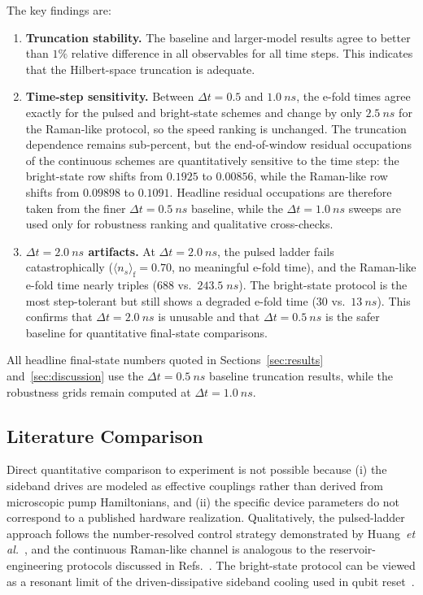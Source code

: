 \documentclass[aps,pra,twocolumn,reprint,floatfix,amsmath,amssymb]{revtex4-2}
\begin{document}
The key findings are:
\begin{enumerate}
\item \textbf{Truncation stability.}  The baseline and larger-model results agree to better than $1\%$ relative difference in all observables for all time steps.
This indicates that the Hilbert-space truncation is adequate.
\item \textbf{Time-step sensitivity.}  Between $\Delta t = 0.5$ and $\SI{1.0}{ns}$, the e-fold times agree exactly for the pulsed and bright-state schemes and change by only $\SI{2.5}{ns}$ for the Raman-like protocol, so the speed ranking is unchanged.
The truncation dependence remains sub-percent, but the end-of-window residual occupations of the continuous schemes are quantitatively sensitive to the time step: the bright-state row shifts from $0.1925$ to $0.00856$, while the Raman-like row shifts from $0.09898$ to $0.1091$.
Headline residual occupations are therefore taken from the finer $\Delta t = \SI{0.5}{ns}$ baseline, while the $\Delta t = \SI{1.0}{ns}$ sweeps are used only for robustness ranking and qualitative cross-checks.
\item \textbf{$\Delta t = \SI{2.0}{ns}$ artifacts.}  At $\Delta t = \SI{2.0}{ns}$, the pulsed ladder fails catastrophically ($\langle n_s\rangle_{\mathrm{f}} = 0.70$, no meaningful e-fold time), and the Raman-like e-fold time nearly triples ($688$ vs.\ $243.5\;\si{ns}$).
The bright-state protocol is the most step-tolerant but still shows a degraded e-fold time ($30$ vs.\ $\SI{13}{ns}$).
This confirms that $\Delta t = \SI{2.0}{ns}$ is unusable and that $\Delta t = \SI{0.5}{ns}$ is the safer baseline for quantitative final-state comparisons.
\end{enumerate}

All headline final-state numbers quoted in Sections~\ref{sec:results} and~\ref{sec:discussion} use the $\Delta t = \SI{0.5}{ns}$ baseline truncation results, while the robustness grids remain computed at $\Delta t = \SI{1.0}{ns}$.

\subsection{Literature Comparison}

Direct quantitative comparison to experiment is not possible because (i) the sideband drives are modeled as effective couplings rather than derived from microscopic pump Hamiltonians, and (ii) the specific device parameters do not correspond to a published hardware realization.
Qualitatively, the pulsed-ladder approach follows the number-resolved control strategy demonstrated by Huang~\textit{et al.}~\cite{huang2025fastsideband}, and the continuous Raman-like channel is analogous to the reservoir-engineering protocols discussed in Refs.~\cite{poyatos1996quantum,leghtas2015confining}.
The bright-state protocol can be viewed as a resonant limit of the driven-dissipative sideband cooling used in qubit reset~\cite{magnard2018reset,geerlings2013demonstrating}.
\end{document}
